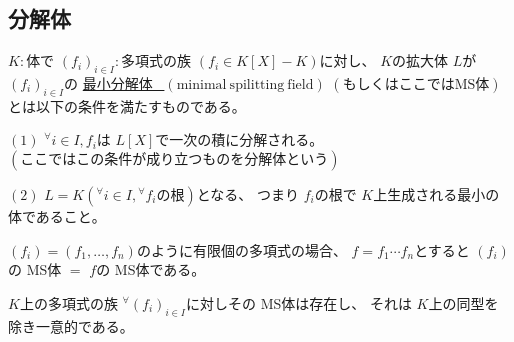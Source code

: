 \documentclass[../master_galois_theory]{subfiles}
\begin{document}
\subsection{分解体}

\begin{defi}
  $K:$体で $(f_i)_{i \in I}:$多項式の族 $(f_i \in K[X] - K)$に対し、
  $K$の拡大体 $L$が $(f_i)_{i \in I}$の
  \underline{最小分解体 \  $(\mathrm{minimal \  spilitting \  field})$}
  $(もしくはここでは \mathrm{MS}体)$とは以下の条件を満たすものである。

  $(1)$
  ${}^\forall i \in I , f_i$は $L[X]$で一次の積に分解される。
  $(ここではこの条件が成り立つものを分解体という)$

  $(2)$
  $L = K({}^\forall i \in I , {}^\forall f_i の根)$となる、
  つまり $f_i$の根で $K$上生成される最小の体であること。
\end{defi}

\begin{rem}
  $(f_i) = (f_1 , \dots , f_n)$のように有限個の多項式の場合、
  $f = f_1 \cdots f_n$とすると
  $(f_i)$の \rm{MS}体 $=$ $f$の \rm{MS}体である。
\end{rem}

\begin{prop} \label{prop:7.4}
  $K$上の多項式の族 ${}^\forall (f_i)_{i \in I}$に対しその \rm{MS}体は存在し、
  それは $K$上の同型を除き一意的である。
\end{prop}
\end{document}
